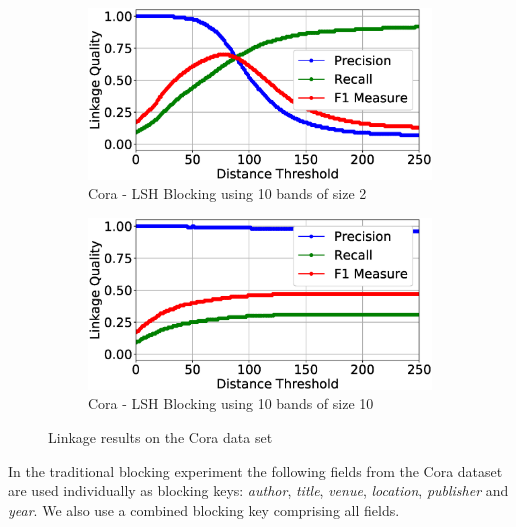 \documentclass{llncs}
\begin{document}
\begin{figure}
\begin{subfigure}{.5\textwidth}
  \centering
\includegraphics[width=\textwidth]{figures/plotLQ-cora-lsh-10-2}
\caption{Cora - LSH Blocking using 10 bands of size 2}
\end{subfigure}%
\begin{subfigure}{.5\textwidth}
  \centering
\includegraphics[width=\textwidth]{figures/plotLQ-cora-lsh-10-10}
\caption{Cora - LSH Blocking using 10 bands of size 10}
\end{subfigure}

\caption{Linkage results on the Cora data set}
\label{cora-quality}
\end{figure}


In the traditional blocking experiment the following fields from the
Cora dataset are used individually as blocking keys: \textit{author},
\textit{title}, \textit{venue}, \textit{location}, \textit{publisher}
and \textit{year}. We also use a combined blocking key comprising all
fields.
\end{document}
